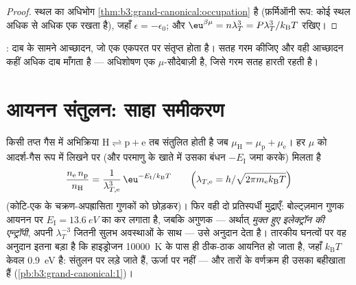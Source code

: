 \begin{proof}
स्थल का अधिभोग
\cref{thm:b3:grand-canonical:occupation} है (फ़र्मिऑनी रूप: कोई स्थल
अधिक से अधिक एक रखता है), जहाँ $\epsilon = -\epsilon_0$; और
$\eu^{\beta\mu} = n\lambda_T^3 = P\lambda_T^3/k_{\text{B}}T$ रखिए।
\end{proof}

\begin{omfigure}

{\small {}: दाब के सामने आच्छादन, जो
एक एकपरत पर संतृप्त होता है। सतह गरम कीजिए और वही आच्छादन कहीं
अधिक दाब माँगता है --- अधिशोषण एक $\mu$-सौदेबाज़ी है, जिसे गरम सतह
हारती रहती है।}
\end{omfigure}

\section{आयनन संतुलन: साहा समीकरण}

\begin{proposition}[साहा का समीकरण]\label{prop:b3:grand-canonical:saha}
किसी तप्त गैस में अभिक्रिया $\text{H} \rightleftharpoons \text{p} +
\text{e}$ तब संतुलित होती है जब $\mu_{\text{H}} = \mu_{\text{p}} +
\mu_{\text{e}}$। हर $\mu$ को आदर्श-गैस रूप में लिखने पर (और परमाणु
के खाते में उसका बंधन $-E_{\text{I}}$ जमा करके) मिलता है
\[
\frac{n_{\text{e}}\,n_{\text{p}}}{n_{\text{H}}}
 = \frac{1}{\lambda_{T,\text{e}}^3}\,
\eu^{-E_{\text{I}}/k_{\text{B}}T}
\qquad\Big(\lambda_{T,\text{e}} =
h/\sqrt{2\pi m_{\text{e}}k_{\text{B}}T}\Big)
\]
(कोटि-एक के चक्रण-अपह्रासिता गुणकों को छोड़कर)। फिर वही दो
प्रतिस्पर्धी मुद्राएँ: बोल्ट्ज़मान गुणक आयनन पर
$E_{\text{I}} = \qty{13.6}{eV}$ का कर लगाता है, जबकि अगुणक --- अर्थात्
\emph{मुक्त हुए इलेक्ट्रॉन की एन्ट्रॉपी}, अपनी $\lambda_T^{-3}$
जितनी सुलभ अवस्थाओं के साथ --- उसे अनुदान देता है। तारकीय घनत्वों पर
वह अनुदान इतना बड़ा है कि हाइड्रोजन \qty{10000}{K} के पास ही ठीक-ठाक
आयनित हो जाता है, जहाँ $k_{\text{B}}T$ केवल
\qty{0.9}{eV} है: संतुलन  पर लड़े जाते हैं, ऊर्जा पर नहीं
--- और तारों के वर्णक्रम ही उसका बहीखाता हैं
(\cref{pb:b3:grand-canonical:1})।
\end{proposition}

